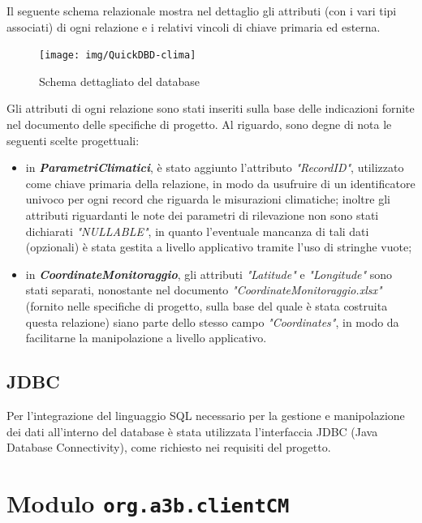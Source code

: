 Il seguente schema relazionale mostra nel dettaglio gli attributi (con i vari tipi associati) di ogni relazione e i relativi vincoli di chiave primaria ed esterna.

\begin{figure}[h]
	\centering
	\caption{Schema dettagliato del database}
	\label{fig:quickdbd-clima}
	\texttt{[image: img/QuickDBD-clima]}
\end{figure}

Gli attributi di ogni relazione sono stati inseriti sulla base delle indicazioni fornite nel documento delle specifiche di progetto. Al riguardo, sono degne di nota le seguenti scelte progettuali:
\begin{itemize}
	\item in \textit{\textbf{ParametriClimatici}}, è stato aggiunto l'attributo \textit{"RecordID"}, utilizzato come chiave primaria della relazione, in modo da usufruire di un identificatore univoco per ogni record che riguarda le misurazioni climatiche; inoltre gli attributi riguardanti le note dei parametri di rilevazione non sono stati dichiarati \textit{"NULLABLE"}, in quanto l'eventuale mancanza di tali dati (opzionali) è stata gestita a livello applicativo tramite l'uso di stringhe vuote;
	\item in \textit{\textbf{CoordinateMonitoraggio}}, gli attributi \textit{"Latitude"} e \textit{"Longitude"} sono stati separati, nonostante nel documento \textit{"CoordinateMonitoraggio.xlsx"} (fornito nelle specifiche di progetto, sulla base del quale è stata costruita questa relazione) siano parte dello stesso campo \textit{"Coordinates"}, in modo da facilitarne la manipolazione a livello applicativo.
\end{itemize}

\section{JDBC}
Per l'integrazione del linguaggio SQL necessario per la gestione e manipolazione dei dati all'interno del database è stata utilizzata l'interfaccia JDBC (Java Database Connectivity), come richiesto nei requisiti del progetto.

\chapter{Modulo \texttt{org.a3b.clientCM}}
\label{ch:client}

